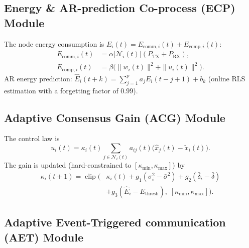 \documentclass[10pt]{article}
\newcommand{\kmax}{\kappa_{\max}}
\newcommand{\kmin}{\kappa_{\min}}
\DeclareMathOperator{\clip}{clip}
\begin{document}
\subsection{Energy \& AR-prediction Co-process (ECP) Module}

The node energy consumption is $E_i(t)=E_{\mathrm{comm},i}(t)+E_{\mathrm{comp},i}(t)$:
\begin{align}
  E_{\mathrm{comm},i}(t) &= \alpha|\mathcal{N}_i(t)|(P_{\mathrm{TX}}+P_{\mathrm{RX}}),\label{eq:energy_comm}\\
  E_{\mathrm{comp},i}(t) &= \beta\bigl(\|w_i(t)\|^2+\|u_i(t)\|^2\bigr).\label{eq:energy_comp}
\end{align}
AR energy prediction: $\hat{E}_i(t+k)=\sum_{j=1}^p a_j E_i(t-j+1)+b_k$ (online RLS estimation with a forgetting factor of $0.99$).

\subsection{Adaptive Consensus Gain (ACG) Module}

The control law is
\begin{equation}\label{eq:control}
  u_i(t) = \kappa_i(t)\sum_{j\in\mathcal{N}_i(t)}a_{ij}(t)\bigl(\hat{x}_j(t)-\tilde{x}_i(t)\bigr).
\end{equation}
The gain is updated (hard-constrained to $[\kmin,\kmax]$) by
\begin{equation}\label{eq:gain}
  \begin{aligned}
    \kappa_i(t+1)=\clip\bigl(&\kappa_i(t)+g_1(\sigma_i^2-\bar{\sigma}^2)+g_2(\bar{\delta}_i-\bar{\delta})\\
    &+g_3(\hat{E}_i-E_{\mathrm{thresh}}),\;[\kmin,\kmax]\bigr).
  \end{aligned}
\end{equation}

\subsection{Adaptive Event-Triggered communication (AET) Module}
\end{document}
